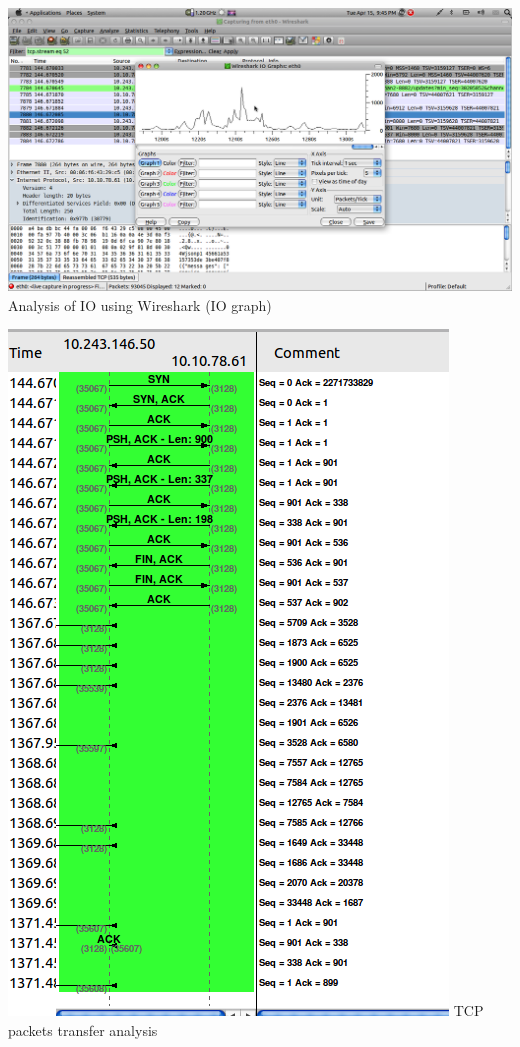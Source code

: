 \documentclass[a4paper,12pt]{report}
\begin{document}
\begin{center}
 \includegraphics[width=13 cm,height=12 cm]{./Screenshot-5.png}
Analysis of IO using  Wireshark (IO graph)
\end{center}
\begin{center}
 \includegraphics[width=13 cm,height=12 cm]{./Screenshot-6.png}
TCP packets transfer analysis
\end{center}
\end{document}
